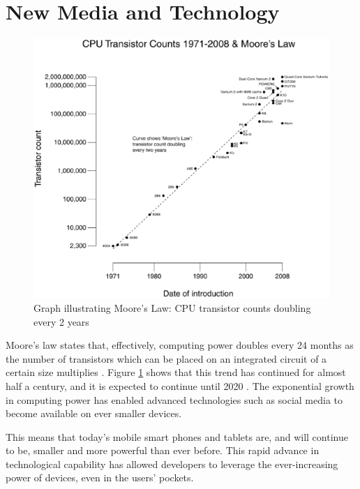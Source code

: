\documentclass[a4paper,11pt]{article}
\begin{document}
    \section{New Media and Technology}

    \begin{figure}
        \begin{center}
            \includegraphics[width=\textwidth]{moores-law}
        \end{center}
        \caption{Graph illustrating Moore's Law: CPU transistor counts doubling
        every 2 years}
        \label{fig:moores-law}
    \end{figure}

    Moore's law states that, effectively, computing power doubles every 24
    months as the number of transistors which can be placed on an integrated
    circuit of a certain size multiplies \cite{schaller1997}. Figure
    \ref{fig:moores-law} shows that this trend has continued for almost half
    a century, and it is expected to continue until 2020 \cite{kanellos2005}.
    The exponential growth in computing power has enabled advanced technologies
    such as social media to become available on ever smaller devices.

    This means that today's mobile smart phones and tablets are, and will
    continue to be, smaller and more powerful than ever before. This rapid
    advance in technological capability has allowed developers to leverage the
    ever-increasing power of devices, even in the users' pockets.
\end{document}
